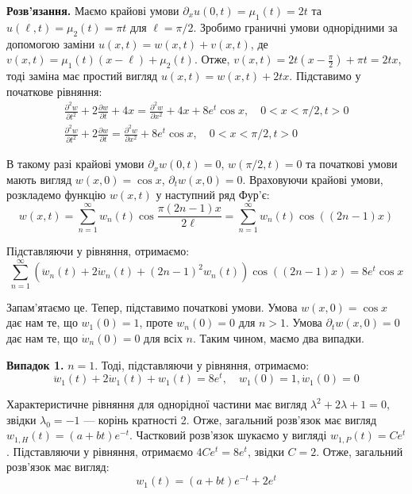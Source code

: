 \documentclass{hw_template}
\begin{document}
\textbf{Розв'язання.} Маємо крайові умови $\partial_xu(0,t)=\mu_1(t)=2t$ та
$u(\ell,t)=\mu_2(t)=\pi t$ для $\ell=\pi/2$. Зробимо граничні умови однорідними
за допомогою заміни $u(x,t) = w(x,t) + v(x,t)$, де
$v(x,t)=\mu_1(t)(x-\ell)+\mu_2(t)$. Отже,
$v(x,t)=2t(x-\frac{\pi}{2})+\pi t=2tx$, тоді заміна має простий вигляд 
$u(x,t) = w(x,t) + 2tx$. Підставимо у початкове рівняння:
\begin{gather*}
    \frac{\partial^2 w}{\partial t^2} + 2\frac{\partial w}{\partial t} + 4x = \frac{\partial^2 w}{\partial x^2} + 4x + 8e^t\cos x, \quad 0 < x < \pi/2, t>0 \\
    \frac{\partial^2 w}{\partial t^2} + 2\frac{\partial w}{\partial t} = \frac{\partial^2 w}{\partial x^2} + 8e^t\cos x, \quad 0 < x < \pi/2, t>0
\end{gather*}

В такому разі крайові умови $\partial_x w(0,t) = 0$, $w(\pi/2,t)=0$ та початкові
умови мають вигляд $w(x,0)=\cos x$, $\partial_t w(x,0)=0$. Враховуючи крайові
умови, розкладемо функцію $w(x,t)$ у наступний ряд Фур'є:
\begin{equation*}
    w(x,t) = \sum_{n=1}^{\infty} w_n(t)\cos \frac{\pi (2n-1)x}{2\ell} = \sum_{n=1}^{\infty} w_n(t)\cos ((2n-1)x)
\end{equation*}

Підставляючи у рівняння, отримаємо:
\begin{equation*}
    \sum_{n=1}^{\infty} \left(\ddot{w}_n(t)+2\dot{w}_n(t) + (2n-1)^2w_n(t)\right)\cos((2n-1)x) = 8e^t\cos x
\end{equation*}

Запам'ятаємо це. Тепер, підставимо початкові умови. Умова $w(x,0) = \cos x$ дає
нам те, що $w_1(0) = 1$, проте $w_n(0) = 0$ для $n>1$. Умова $\partial_t w(x,0)
= 0$ дає нам те, що $\dot{w}_n(0) = 0$ для всіх $n$. Таким чином, маємо два
випадки.

\textbf{Випадок 1.} $n=1$. Тоді, підставляючи у рівняння, отримаємо:
\begin{equation*}
    \ddot{w}_1(t) + 2\dot{w}_1(t) + w_1(t) = 8e^t, \quad w_1(0)=1, \dot{w}_1(0)=0
\end{equation*}

Характеристичне рівняння для однорідної частини має вигляд
$\lambda^2+2\lambda+1=0$, звідки $\lambda_0=-1$ --- корінь кратності 2. Отже,
загальний розв'язок має вигляд $w_{1,H}(t) = (a+bt)e^{-t}$. Частковий розв'язок
шукаємо у вигляді $w_{1,P}(t) = Ce^t$. Підставляючи у рівняння, отримаємо $4Ce^t
= 8e^t$, звідки $C=2$. Отже, загальний розв'язок має вигляд:
\begin{equation*}
    w_1(t) =(a+bt)e^{-t} + 2e^t
\end{equation*}
\end{document}
